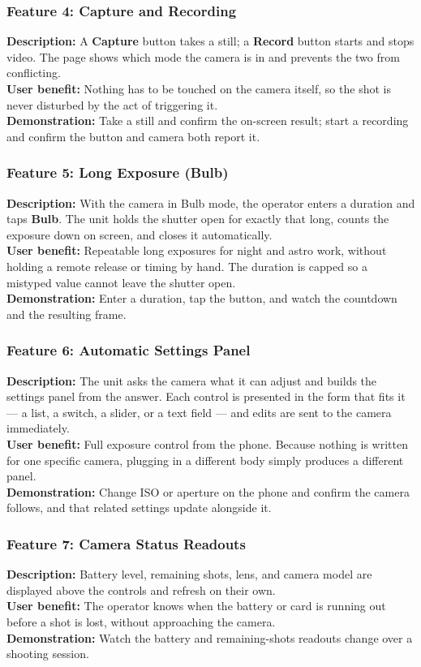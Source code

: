 \documentclass[11pt,a4paper]{article}
\begin{document}
\subsubsection{Feature 4: Capture and Recording}
\textbf{Description:} A \textbf{Capture} button takes a still; a \textbf{Record} button starts and stops video. The page shows which mode the camera is in and prevents the two from conflicting.\\
\textbf{User benefit:} Nothing has to be touched on the camera itself, so the shot is never disturbed by the act of triggering it.\\
\textbf{Demonstration:} Take a still and confirm the on-screen result; start a recording and confirm the button and camera both report it.

\subsubsection{Feature 5: Long Exposure (Bulb)}
\textbf{Description:} With the camera in Bulb mode, the operator enters a duration and taps \textbf{Bulb}. The unit holds the shutter open for exactly that long, counts the exposure down on screen, and closes it automatically.\\
\textbf{User benefit:} Repeatable long exposures for night and astro work, without holding a remote release or timing by hand. The duration is capped so a mistyped value cannot leave the shutter open.\\
\textbf{Demonstration:} Enter a duration, tap the button, and watch the countdown and the resulting frame.

\subsubsection{Feature 6: Automatic Settings Panel}
\textbf{Description:} The unit asks the camera what it can adjust and builds the settings panel from the answer. Each control is presented in the form that fits it --- a list, a switch, a slider, or a text field --- and edits are sent to the camera immediately.\\
\textbf{User benefit:} Full exposure control from the phone. Because nothing is written for one specific camera, plugging in a different body simply produces a different panel.\\
\textbf{Demonstration:} Change ISO or aperture on the phone and confirm the camera follows, and that related settings update alongside it.

\subsubsection{Feature 7: Camera Status Readouts}
\textbf{Description:} Battery level, remaining shots, lens, and camera model are displayed above the controls and refresh on their own.\\
\textbf{User benefit:} The operator knows when the battery or card is running out before a shot is lost, without approaching the camera.\\
\textbf{Demonstration:} Watch the battery and remaining-shots readouts change over a shooting session.
\end{document}
